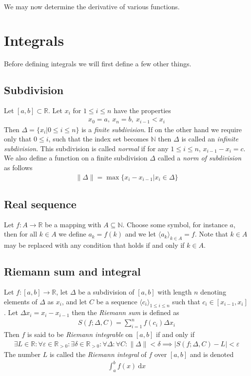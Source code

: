 \documentclass{article}
\theoremstyle{plain}
\theoremstyle{definition}
\newcommand{\R}{\mathbb{R}}
\newcommand{\N}{\mathbb{N}}
\newcommand{\dx}{\text{d}}
\begin{document}
We may now determine the derivative of various functions.
\section{Integrals}
Before defining integrals we will first define a few other things.

\subsection{Subdivision}
Let $[a,b] \subset \mathbb{R}$. Let $x_i$ for $1 \leq i \leq n$ have the
properties
\begin{align}
	x_0 = a,\ x_n = b,\ x_{i-1} < x_i
\end{align}
Then $\Delta = \{x_i|0 \leq i \leq n\}$ is a \textit{finite subdivision}. If on
the other hand we require only that $0 \leq i$, such that the index set becomes
$\mathbb{N}$ then $\Delta$ is called an \textit{infinite subdivision}. This
subdivision is called \textit{normal} if for any $1 \leq i \leq n$, 
$x_{i-1}-x_i = c$. We also define a function on a finite subdivision 
$\Delta$ called a \textit{norm of subdivision} as follows
\begin{align}
	\|\Delta \| = \max \{x_{i}-x_{i-1}|x_i \in \Delta\}
\end{align}
\subsection{Real sequence}
Let $f: A \rightarrow \R$ be a mapping with $A \subseteq \N$. Choose some
symbol, for instance $a$, then for all $k\in A$ we define $a_k = f(k)$ and we
let ${\langle a_k\rangle}_{k\in A}=f$. Note that $k\in A$ may be replaced with
any condition that holds if and only if $k\in A$.
\subsection{Riemann sum and integral}
Let $f:[a,b]\rightarrow \R$, let $\Delta$ be a subdivision of $[a,b]$
with length $n$ denoting elements of $\Delta$ as $x_i$, and let $C$
be a sequence $\langle c_i \rangle_{1\leq i\leq n}$ such that $c_i \in
[x_{i-1},x_i]$. Let $\Delta x_i = x_i-x_{i-1}$ then the \textit{Riemann sum} is
defined as
\begin{align}
	S(f;\Delta,C)= \sum_{i=1}^n f(c_i)\Delta x_i
\end{align}
Then $f$ is said to be \textit{Riemann integrable} on $[a,b]$ if and only if
\begin{align*}
	\exists L\in\R:\forall\varepsilon\in\R_{>0}:\exists\delta\in\R_{>0}:
	\forall\Delta:\forall C:\|\Delta\|<\delta\implies
	|S(f;\Delta,C)-L|<\varepsilon
\end{align*}
The number $L$ is called the \textit{Riemann integral} of $f$ over $[a,b]$ and
is denoted
\begin{align*}
	\int_a^b f(x)\ \dx x
\end{align*}
\end{document}
